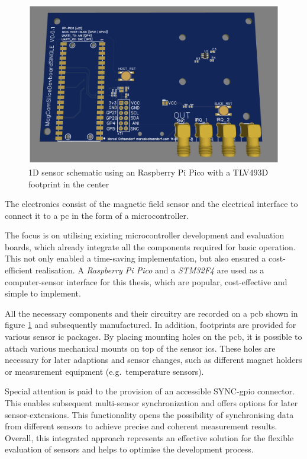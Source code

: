\begin{figure}
\centering
\includegraphics{./generated_images/border_1D_sensor_schematic_using_an_Raspberry_Pi_Pico_with_a_TLV493D_footprint_in_the_center.png}
\caption{1D sensor schematic using an Raspberry Pi Pico with a TLV493D
footprint in the center
\label{1D_sensor_schematic_using_an_Raspberry_Pi_Pico_with_a_TLV493D_footprint_in_the_center.png}}
\end{figure}

The electronics consist of the magnetic field sensor and the electrical
interface to connect it to a \gls{pc} in the form of a microcontroller.

The focus is on utilising existing microcontroller development and
evaluation boards, which already integrate all the components required
for basic operation. This not only enabled a time-saving implementation,
but also ensured a cost-efficient realisation. A \emph{Raspberry Pi
Pico} and a \emph{STM32F4} are used as a computer-sensor interface for
this thesis, which are popular, cost-effective and simple to implement.

All the necessary components and their circuitry are recorded on a
\gls{pcb} shown in figure
\ref{1D_sensor_schematic_using_an_Raspberry_Pi_Pico_with_a_TLV493D_footprint_in_the_center.png}
and subsequently manufactured. In addition, footprints are provided for
various sensor \gls{ic} packages. By placing mounting holes on the
\gls{pcb}, it is possible to attach various mechanical mounts on top of
the sensor \gls{ic}s. These holes are necessary for later adaptions and
sensor changes, such as different magnet holders or measurement
equipment (e.g.~temperature sensors).

Special attention is paid to the provision of an accessible
SYNC-\gls{gpio} connector. This enables subsequent multi-sensor
synchronization and offers options for later sensor-extensions. This
functionality opens the possibility of synchronising data from different
sensors to achieve precise and coherent measurement results. Overall,
this integrated approach represents an effective solution for the
flexible evaluation of sensors and helps to optimise the development
process.

